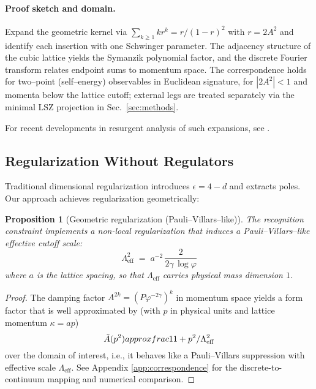 \documentclass[11pt,a4paper]{article}
\newtheorem{proposition}[theorem]{Proposition}
\theoremstyle{definition}
\theoremstyle{remark}
\begin{document}
\paragraph{Proof sketch and domain.}
Expand the geometric kernel via $\sum_{k\ge1} k r^k = r/(1-r)^2$ with $r=2A^2$ and identify each insertion with one Schwinger parameter. The adjacency structure of the cubic lattice yields the Symanzik polynomial factor, and the discrete Fourier transform relates endpoint sums to momentum space. The correspondence holds for two--point (self--energy) observables in Euclidean signature, for $|2A^2|<1$ and momenta below the lattice cutoff; external legs are treated separately via the minimal LSZ projection in Sec.~\ref{sec:methods}.

For recent developments in resurgent analysis of such expansions, see \cite{Aniceto2019,Dorigoni2019}.

\subsection{Regularization Without Regulators}

Traditional dimensional regularization introduces $\epsilon = 4-d$ and extracts poles. Our approach achieves regularization geometrically:

\begin{proposition}[Geometric regularization (Pauli--Villars--like)]
The recognition constraint implements a non-local regularization that induces a Pauli--Villars--like effective cutoff scale:
\[
\Lambda_{\text{eff}}^{2} \;=\; a^{-2}\,\frac{2}{2\gamma\,\log\varphi}
\]
where $a$ is the lattice spacing, so that $\Lambda_{\text{eff}}$ carries physical mass dimension $1$.
\end{proposition}

\begin{proof}
The damping factor $A^{2k} = (P\varphi^{-2\gamma})^k$ in momentum space yields a form factor that is well approximated by (with $p$ in physical units and lattice momentum $\kappa = a p$)
\[
\tilde{A}(p^2) \\approx \\frac{1}{1 + p^2/\Lambda_{\text{eff}}^2}
\]
over the domain of interest, i.e., it behaves like a Pauli--Villars suppression with effective scale $\Lambda_{\text{eff}}$. See Appendix \ref{app:correspondence} for the discrete-to-continuum mapping and numerical comparison.
\end{proof}

\end{document}
